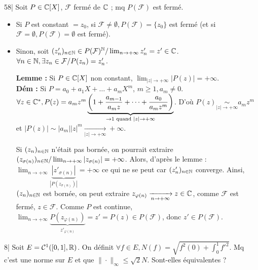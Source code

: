
\begin{statementbox}
58| Soit $P \in \mathbb C[X]$, $\mathcal{F}$ fermé de $\mathbb C$ ; mq $P(\mathcal{F})$ est fermé.
\end{statementbox}

\begin{solution}
\begin{itemize}
  \item Si $P$ est constant $= z_0$, si $\mathcal{F} \neq \emptyset, P(\mathcal{F}) = \{z_0\}$ est fermé (et si $\mathcal{F} = \emptyset, P(\mathcal{F}) = \emptyset$ est fermé).
  \item Sinon, soit $(z'_n)_{n \in \mathbb N} \in P(\mathcal{F})^\mathbb N / \lim_{n \to +\infty} z'_n = z' \in \mathbb C$. $\forall n \in \mathbb N, \exists z_n \in \mathcal{F} / P(z_n) = z'_n$.

  \textbf{Lemme :} Si $P \in \mathbb C[X]$ non constant, $\lim_{|z| \to +\infty} |P(z)| = +\infty$. \\
  \textbf{Dém :} Si $P = a_0 + a_1 X + \dots + a_m X^m$, $m \geq 1, a_m \neq 0$. $\forall z \in \mathbb C^*, P(z) = a_m z^m \underbrace{\left(1 + \frac{a_{m-1}}{a_m z} + \dots + \frac{a_0}{a_m z^m}\right)}_{\to 1 \text{ quand } |z| \to +\infty}$.
  D'où $P(z) \underset{|z| \to +\infty}{\sim} a_m z^m$ et $|P(z)| \sim |a_m| |z|^m \xrightarrow[|z| \to +\infty]{} +\infty$.

  Si $(z_n)_{n \in \mathbb N}$ n'était pas bornée, on pourrait extraire $(z_{\sigma(n)})_{n \in \mathbb N} / \lim_{n \to +\infty} |z_{\sigma(n)}| = +\infty$.
  Alors, d'après le lemme : $\lim_{n \to +\infty} \underbrace{|z'_{\sigma(n)}|}_{|P(z_{\sigma(n)})|} = +\infty$ ce qui ne se peut car $(z'_n)_{n \in \mathbb N}$ converge.
  Ainsi, $(z_n)_{n \in \mathbb N}$ est bornée, on peut extraire $z_{\varphi(n)} \xrightarrow[n \to +\infty]{} z \in \mathbb C$, comme $\mathcal{F}$ est fermé, $z \in \mathcal{F}$.
  Comme $P$ est continue, $\lim_{n \to +\infty} \underbrace{P(z_{\varphi(n)})}_{z'_{\varphi(n)}} = z' = P(z) \in P(\mathcal{F})$, donc $z' \in P(\mathcal{F})$.
\end{itemize}
\end{solution}


\begin{statementbox}
8| Soit $E = \mathcal{C}^1([0, 1], \mathbb R)$.
On définit $\forall f \in E, N(f) = \sqrt{f^2(0) + \int_0^1 {f'}^2}$.
Mq c'est une norme sur $E$ et que $\|\cdot\|_\infty \leq \sqrt{2} N$. Sont-elles équivalentes ?
\end{statementbox}


